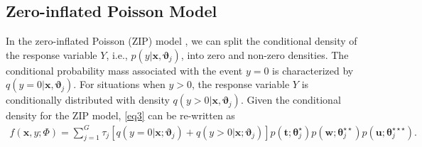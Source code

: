 \documentclass[11pt,letterpaper]{article}
\numberwithin{equation}{section}
\numberwithin{equation}{section}
\numberwithin{equation}{section}
\begin{document}

\subsection{Zero-inflated Poisson Model}%

In the zero-inflated Poisson (ZIP) model \citep[see][]{Lambert}, we can split the conditional density of the response variable $Y$, i.e., $p(y|\bm{x},\bm{\vartheta}_j)$, into zero and non-zero densities. The conditional probability mass associated with the event $y=0$ is characterized by $q(y = 0|\bm{x},\bm{\vartheta}_{j})$. For situations when $y > 0$, the response variable $Y$ is conditionally distributed with density $q(y > 0|\bm{x}, \bm{\vartheta}_{j} )$. Given the conditional density for the ZIP model, \eqref{eq3} can be re-written as
 \begin{align}
 f(\bm x, y; \Phi)= \sum_{j=1}^{G} \tau_j \left[ q(y = 0|\bm{x};\bm{\vartheta}_{j} ) +  q(y > 0|\bm{x} ; \bm{\vartheta}_{j}  ) \right]   p(\bm{t};\bm{\theta}_j^{\star})p(\bm{w};\bm{\theta}_j^{\star\star})p(\bm{u};\bm{\theta}_j^{\star\star\star}).
\end{align}
\end{document}
